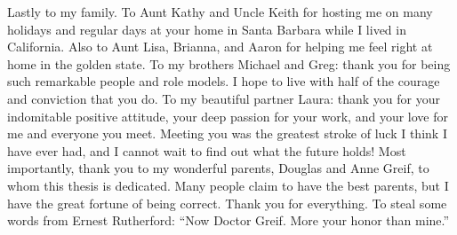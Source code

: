 {  Lastly to my family.
  To Aunt Kathy and Uncle Keith for hosting me on many holidays and regular days at your home in Santa Barbara while I lived in California.
  Also to Aunt Lisa, Brianna, and Aaron for helping me feel right at home in the golden state.
  To my brothers Michael and Greg: thank you for being such remarkable people and role models.
  I hope to live with half of the courage and conviction that you do.
  To my beautiful partner Laura: thank you for your indomitable positive attitude, your deep passion for your work, and your love for me and everyone you meet.
  Meeting you was the greatest stroke of luck I think I have ever had, and I cannot wait to find out what the future holds!
  Most importantly, thank you to my wonderful parents, Douglas and Anne Greif, to whom this thesis is dedicated.
  Many people claim to have the best parents, but I have the great fortune of being correct.
  Thank you for everything.
  To steal some words from Ernest Rutherford: ``Now Doctor Greif. More your honor than mine.''

  
  
}



